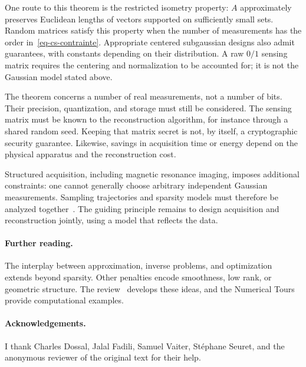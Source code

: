 One route to this theorem is the restricted isometry property: $A$ approximately preserves Euclidean lengths of vectors supported on sufficiently small sets. Random matrices satisfy this property when the number of measurements has the order in~\eqref{eq-cs-contrainte}. Appropriate centered subgaussian designs also admit guarantees, with constants depending on their distribution. A raw $0/1$ sensing matrix requires the centering and normalization to be accounted for; it is not the Gaussian model stated above.

The theorem concerns a number of real measurements, not a number of bits. Their precision, quantization, and storage must still be considered. The sensing matrix must be known to the reconstruction algorithm, for instance through a shared random seed. Keeping that matrix secret is not, by itself, a cryptographic security guarantee. Likewise, savings in acquisition time or energy depend on the physical apparatus and the reconstruction cost.

Structured acquisition, including magnetic resonance imaging, imposes additional constraints: one cannot generally choose arbitrary independent Gaussian measurements. Sampling trajectories and sparsity models must therefore be analyzed together~\cite{AdcockBreaking,Chauffert14}. The guiding principle remains to design acquisition and reconstruction jointly, using a model that reflects the data.

\paragraph*{Further reading.}
The interplay between approximation, inverse problems, and optimization extends beyond sparsity. Other penalties encode smoothness, low rank, or geometric structure. The review~\cite{2014-vaiter-ps-review} develops these ideas, and the Numerical Tours~\cite{2011-peyre-cise} provide computational examples.

\ifdefined\StandaloneChapter
\paragraph*{Acknowledgements.}
I thank Charles Dossal, Jalal Fadili, Samuel Vaiter, Stéphane Seuret, and the anonymous reviewer of the original text for their help.
\fi
